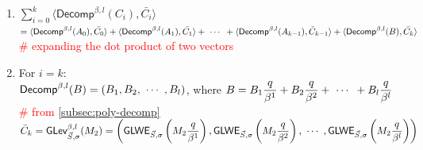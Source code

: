 \begin{myproof}
\begin{enumerate}
\item $\sum\limits_{i=0}^{k}\langle \textsf{Decomp}^{\beta, l}(C_i), \bar{C_i} \rangle$ \\
$= \langle \textsf{Decomp}^{\beta, l}(A_0), \bar{C_0} \rangle + \langle \textsf{Decomp}^{\beta, l}(A_1), \bar{C_1} \rangle + \text{ } \text{$\cdots$} \text{ } + \langle \textsf{Decomp}^{\beta, l}(A_{k-1}), \bar{C}_{k-1} \rangle + \langle \textsf{Decomp}^{\beta, l}(B), \bar{C_k} \rangle$ \\
\textcolor{red}{\# expanding the dot product of two vectors}
\item For $i = k$: \\
$\textsf{Decomp}^{\beta, l}(B) = (B_1, B_2, \text{ } \text{$\cdots$} \text{ }, B_l)$, where $B = B_1\dfrac{q}{\beta^1} + B_2\dfrac{q}{\beta^2} + \text{ } \text{$\cdots$} \text{ } + B_l\dfrac{q}{\beta^l}$ \textcolor{red}{\# from \autoref{subsec:poly-decomp}}\\
$\bar{C}_k = \textsf{GLev}_{\vec{S}, \sigma}^{\beta, l}(M_2) = \left(\textsf{GLWE}_{\vec{S}, \sigma}\left(M_{2}\dfrac{q}{\beta^1}\right), \textsf{GLWE}_{\vec{S}, \sigma}\left(M_{2}\dfrac{q}{\beta^2}\right), \text{ } \text{$\cdots$} \text{ }, \textsf{GLWE}_{\vec{S}, \sigma}\left(M_{2}\dfrac{q}{\beta^l}\right) \right)$ \\
$ $


\end{enumerate}
\end{myproof}

